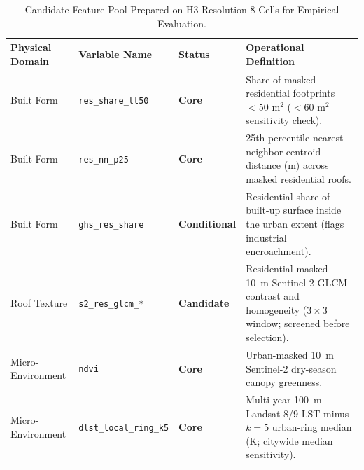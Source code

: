 \begin{table}[htbp]
\centering
\caption{Candidate Feature Pool Prepared on H3 Resolution-8 Cells for Empirical Evaluation.}
\label{tab:feature_pool}
\footnotesize
\begin{tabularx}{\textwidth}{@{}>{\raggedright\arraybackslash}p{2.4cm}>{\raggedright\arraybackslash}p{3.2cm}>{\raggedright\arraybackslash}p{1.8cm}>{\raggedright\arraybackslash}X@{}}
\toprule
\textbf{Physical Domain} & \textbf{Variable Name} & \textbf{Status} & \textbf{Operational Definition} \\
\midrule
Built Form & \texttt{res\_share\_lt50} & \textbf{Core} & Share of masked residential footprints $<50\text{ m}^2$ ($<60\text{ m}^2$ sensitivity check). \\
Built Form & \texttt{res\_nn\_p25} & \textbf{Core} & 25th-percentile nearest-neighbor centroid distance (m) across masked residential roofs. \\
Built Form & \texttt{ghs\_res\_share} & \textbf{Conditional} & Residential share of built-up surface inside the urban extent (flags industrial encroachment). \\
Roof Texture & \texttt{s2\_res\_glcm\_*} & \textbf{Candidate} & Residential-masked 10~m Sentinel-2 GLCM contrast and homogeneity ($3\times3$ window; screened before selection). \\
Micro-Environment & \texttt{ndvi} & \textbf{Core} & Urban-masked 10~m Sentinel-2 dry-season canopy greenness. \\
Micro-Environment & \texttt{dlst\_local\_ring\_k5} & \textbf{Core} & Multi-year 100~m Landsat 8/9 LST minus $k=5$ urban-ring median (K; citywide median sensitivity). \\
\bottomrule
\end{tabularx}
\end{table}
